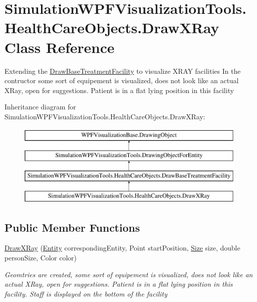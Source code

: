 \hypertarget{class_simulation_w_p_f_visualization_tools_1_1_health_care_objects_1_1_draw_x_ray}{}\section{Simulation\+W\+P\+F\+Visualization\+Tools.\+Health\+Care\+Objects.\+Draw\+X\+Ray Class Reference}
\label{class_simulation_w_p_f_visualization_tools_1_1_health_care_objects_1_1_draw_x_ray}


Extending the \hyperlink{class_simulation_w_p_f_visualization_tools_1_1_health_care_objects_1_1_draw_base_treatment_facility}{Draw\+Base\+Treatment\+Facility} to visualize X\+R\+AY facilities In the contructor some sort of equipement is visualized, does not look like an actual X\+Ray, open for suggestions. Patient is in a flat lying position in this facility  


Inheritance diagram for Simulation\+W\+P\+F\+Visualization\+Tools.\+Health\+Care\+Objects.\+Draw\+X\+Ray\+:\begin{figure}[H]
\begin{center}
\leavevmode
\includegraphics[height=4.000000cm]{class_simulation_w_p_f_visualization_tools_1_1_health_care_objects_1_1_draw_x_ray}
\end{center}
\end{figure}
\subsection*{Public Member Functions}
\begin{DoxyCompactItemize}
\item 
\hyperlink{class_simulation_w_p_f_visualization_tools_1_1_health_care_objects_1_1_draw_x_ray_ae9e447a21120ca6756a004b58ed54d22}{Draw\+X\+Ray} (\hyperlink{class_simulation_core_1_1_h_c_c_m_elements_1_1_entity}{Entity} corresponding\+Entity, Point start\+Position, \hyperlink{class_simulation_w_p_f_visualization_tools_1_1_health_care_objects_1_1_draw_base_treatment_facility_a83f48a13fa5f4f714e22088818f2038a}{Size} size, double person\+Size, Color color)
\begin{DoxyCompactList}\small\item\em Geomtries are created, some sort of equipement is visualized, does not look like an actual X\+Ray, open for suggestions. Patient is in a flat lying position in this facility. Staff is displayed on the bottom of the facility \end{DoxyCompactList}\end{DoxyCompactItemize}
